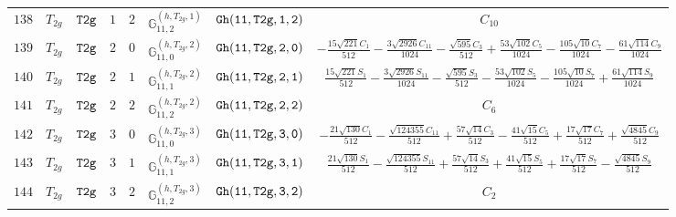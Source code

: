 \documentclass[fleqn,8pt]{jsarticle}
\begin{document}
\begin{table}[ht!]
\begin{center}
\begin{tabular}{cccccccc}
$ 138 $ & $ T_{2g} $ & $ {\tt T2g} $ & $ 1 $ & $ 2 $ & $ \mathbb{G}_{11,2}^{(h,T_{2g},1)} $ & $ {\tt Gh(11,T2g,1,2)} $ & $ C_{10} $ \\
$ 139 $ & $ T_{2g} $ & $ {\tt T2g} $ & $ 2 $ & $ 0 $ & $ \mathbb{G}_{11,0}^{(h,T_{2g},2)} $ & $ {\tt Gh(11,T2g,2,0)} $ & $ - \frac{15 \sqrt{221} C_{1}}{512} - \frac{3 \sqrt{2926} C_{11}}{1024} - \frac{\sqrt{595} C_{3}}{512} + \frac{53 \sqrt{102} C_{5}}{1024} - \frac{105 \sqrt{10} C_{7}}{1024} - \frac{61 \sqrt{114} C_{9}}{1024} $ \\
$ 140 $ & $ T_{2g} $ & $ {\tt T2g} $ & $ 2 $ & $ 1 $ & $ \mathbb{G}_{11,1}^{(h,T_{2g},2)} $ & $ {\tt Gh(11,T2g,2,1)} $ & $ \frac{15 \sqrt{221} S_{1}}{512} - \frac{3 \sqrt{2926} S_{11}}{1024} - \frac{\sqrt{595} S_{3}}{512} - \frac{53 \sqrt{102} S_{5}}{1024} - \frac{105 \sqrt{10} S_{7}}{1024} + \frac{61 \sqrt{114} S_{9}}{1024} $ \\
$ 141 $ & $ T_{2g} $ & $ {\tt T2g} $ & $ 2 $ & $ 2 $ & $ \mathbb{G}_{11,2}^{(h,T_{2g},2)} $ & $ {\tt Gh(11,T2g,2,2)} $ & $ C_{6} $ \\
$ 142 $ & $ T_{2g} $ & $ {\tt T2g} $ & $ 3 $ & $ 0 $ & $ \mathbb{G}_{11,0}^{(h,T_{2g},3)} $ & $ {\tt Gh(11,T2g,3,0)} $ & $ - \frac{21 \sqrt{130} C_{1}}{512} - \frac{\sqrt{124355} C_{11}}{512} + \frac{57 \sqrt{14} C_{3}}{512} - \frac{41 \sqrt{15} C_{5}}{512} + \frac{17 \sqrt{17} C_{7}}{512} + \frac{\sqrt{4845} C_{9}}{512} $ \\
$ 143 $ & $ T_{2g} $ & $ {\tt T2g} $ & $ 3 $ & $ 1 $ & $ \mathbb{G}_{11,1}^{(h,T_{2g},3)} $ & $ {\tt Gh(11,T2g,3,1)} $ & $ \frac{21 \sqrt{130} S_{1}}{512} - \frac{\sqrt{124355} S_{11}}{512} + \frac{57 \sqrt{14} S_{3}}{512} + \frac{41 \sqrt{15} S_{5}}{512} + \frac{17 \sqrt{17} S_{7}}{512} - \frac{\sqrt{4845} S_{9}}{512} $ \\
$ 144 $ & $ T_{2g} $ & $ {\tt T2g} $ & $ 3 $ & $ 2 $ & $ \mathbb{G}_{11,2}^{(h,T_{2g},3)} $ & $ {\tt Gh(11,T2g,3,2)} $ & $ C_{2} $ \\
 \hline \hline
\end{tabular}
\end{center}
\end{table}
\end{document}
